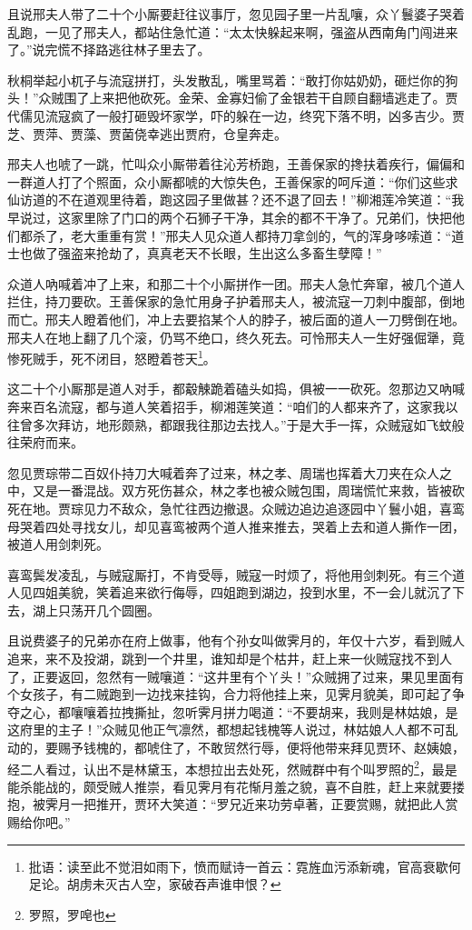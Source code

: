 \documentclass[12pt,oneside]{book}
\begin{document}
且说邢夫人带了二十个小厮要赶往议事厅，忽见园子里一片乱嚷，众丫鬟婆子哭着乱跑，一见了邢夫人，都站住急忙道：“太太快躲起来啊，强盗从西南角门闯进来了。”说完慌不择路逃往林子里去了。

秋桐举起小杌子与流寇拼打，头发散乱，嘴里骂着：“敢打你姑奶奶，砸烂你的狗头！”众贼围了上来把他砍死。金荣、金寡妇偷了金银若干自顾自翻墙逃走了。贾代儒见流寇疯了一般打砸毁坏家学，吓的躲在一边，终究下落不明，凶多吉少。贾芝、贾萍、贾藻、贾菌侥幸逃出贾府，仓皇奔走。

邢夫人也唬了一跳，忙叫众小厮带着往沁芳桥跑，王善保家的搀扶着疾行，偏偏和一群道人打了个照面，众小厮都唬的大惊失色，王善保家的呵斥道：“你们这些求仙访道的不在道观里待着，跑这园子里做甚？还不退了回去！”柳湘莲冷笑道：“我早说过，这家里除了门口的两个石狮子干净，其余的都不干净了。兄弟们，快把他们都杀了，老大重重有赏！”邢夫人见众道人都持刀拿剑的，气的浑身哆嗦道：“道士也做了强盗来抢劫了，真真老天不长眼，生出这么多畜生孽障！”

众道人吶喊着冲了上来，和那二十个小厮拼作一团。邢夫人急忙奔窜，被几个道人拦住，持刀要砍。王善保家的急忙用身子护着邢夫人，被流寇一刀刺中腹部，倒地而亡。邢夫人瞪着他们，冲上去要掐某个人的脖子，被后面的道人一刀劈倒在地。邢夫人在地上翻了几个滚，仍骂不绝口，终久死去。可怜邢夫人一生好强倔犟，竟惨死贼手，死不闭目，怒瞪着苍天\footnote{批语：读至此不觉泪如雨下，愤而赋诗一首云：霓旌血污添新魂，官高衰歇何足论。胡虏未灭古人空，家破吞声谁申恨？}。

这二十个小厮那是道人对手，都觳觫跪着磕头如捣，俱被一一砍死。忽那边又吶喊奔来百名流寇，都与道人笑着招手，柳湘莲笑道：“咱们的人都来齐了，这家我以往曾多次拜访，地形颇熟，都跟我往那边去找人。”于是大手一挥，众贼寇如飞蚊般往荣府而来。

忽见贾琮带二百奴仆持刀大喊着奔了过来，林之孝、周瑞也挥着大刀夹在众人之中，又是一番混战。双方死伤甚众，林之孝也被众贼包围，周瑞慌忙来救，皆被砍死在地。贾琮见力不敌众，急忙往西边撤退。众贼边追边追逐园中丫鬟小姐，喜鸾母哭着四处寻找女儿，却见喜鸾被两个道人推来推去，哭着上去和道人撕作一团，被道人用剑刺死。

喜鸾鬓发凌乱，与贼寇厮打，不肯受辱，贼寇一时烦了，将他用剑刺死。有三个道人见四姐美貌，笑着追来欲行侮辱，四姐跑到湖边，投到水里，不一会儿就沉了下去，湖上只荡开几个圆圈。

且说费婆子的兄弟亦在府上做事，他有个孙女叫做霁月的，年仅十六岁，看到贼人追来，来不及投湖，跳到一个井里，谁知却是个枯井，赶上来一伙贼寇找不到人了，正要返回，忽然有一贼嚷道：“这井里有个丫头！”众贼拥了过来，果见里面有个女孩子，有二贼跑到一边找来挂钩，合力将他挂上来，见霁月貌美，即可起了争夺之心，都嚷嚷着拉拽撕扯，忽听霁月拼力喝道：“不要胡来，我则是林姑娘，是这府里的主子！”众贼见他正气凛然，都想起钱槐等人说过，林姑娘人人都不可乱动的，要赐予钱槐的，都唬住了，不敢贸然行辱，便将他带来拜见贾环、赵姨娘，经二人看过，认出不是林黛玉，本想拉出去处死，然贼群中有个叫罗照的\footnote{罗照，罗唣也}，最是能杀能战的，颇受贼人推崇，看见霁月有花惭月羞之貌，喜不自胜，赶上来就要搂抱，被霁月一把推开，贾环大笑道：“罗兄近来功劳卓著，正要赏赐，就把此人赏赐给你吧。”
\end{document}
